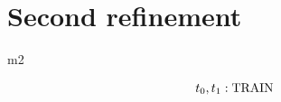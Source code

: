 \documentclass[12pt]{amsart}
\begin{document}
\section{Second refinement}

\begin{machine}{m2}


%
%
%
%
%
\begin{align*}
	t_0,t_1 : \text{TRAIN}
\end{align*}
%
%
%
%
%
%
%
%

\end{machine}
\end{document}
